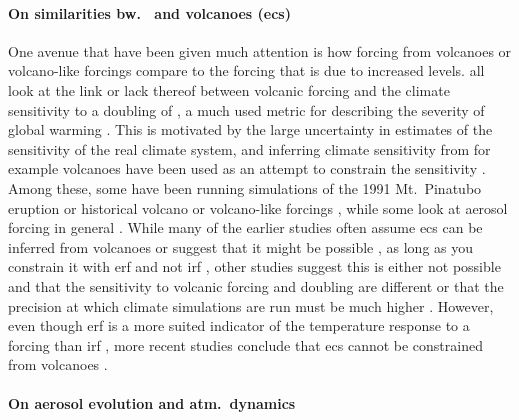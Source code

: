 \documentclass{ametsocV5}
\begin{document}
\paragraph*{On similarities bw.\  and volcanoes (\acrshort{ecs})}

One avenue that have been given much attention is how forcing from volcanoes or
volcano-like forcings compare to the forcing that is due to increased  levels.
\citet{boer2007,marvel2016,merlis2014,ollila2016,richardson2019,salvi2022,wigley2005}
all look at the link or lack thereof between volcanic forcing and the climate
sensitivity to a doubling of , a much used metric for describing the severity of
global warming \citep{marvel2016}. This is motivated by the large uncertainty in
estimates of the sensitivity of the real climate system, and inferring climate
sensitivity from for example volcanoes have been used as an attempt to constrain the
sensitivity \citep{boer2007}. Among these, some have been running simulations of the
1991 Mt.\ Pinatubo eruption \citep{merlis2014,ollila2016} or historical volcano or
volcano-like forcings \citep{boer2007,marvel2016,wigley2005}, while some look at aerosol
forcing in general \citep{richardson2019,salvi2022}. While many of the earlier studies
often assume \acrshort{ecs} can be inferred from volcanoes \citep{wigley2005} or suggest
that it might be possible \citep{bender2010}, as long as you constrain it with
\acrfull{erf} and not \acrfull{irf} \citep{richardson2019}, other studies suggest this
is either not possible and that the sensitivity to volcanic forcing and 
doubling are different or that the precision at which climate simulations are run must
be much higher \citep{douglass2006,boer2007,salvi2022}. However, even though
\acrshort{erf} is a more suited indicator of the temperature response to a forcing than
\acrshort{irf} \citep{marvel2016,richardson2019}, more recent studies conclude that
\acrshort{ecs} cannot be constrained from volcanoes \citep{pauling2023}.

\paragraph*{On aerosol evolution and atm.\ dynamics}
\end{document}
